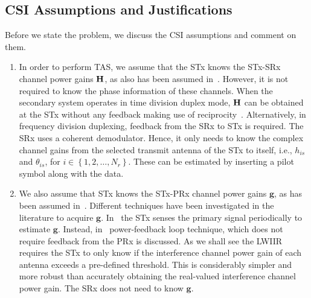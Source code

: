 \documentclass[12pt,draftcls,peerreview,onecolumn]{IEEEtran}
\newcommand{\ie}{{i.e.}}
\newcommand{\mtx}[1]{{\bf #1}} %
\newcommand{\Nr}{{N_r}}
\newcommand{\such}{h}
\newcommand{\puch}{g}
\newcommand{\hk}[1]{{\such_{#1}}}
\newcommand{\g}{\mathbf{\puch}}
\newcommand{\nropts}{\left\{1,2,\ldots,\Nr\right\}}
\newcommand{\suchph}{\theta}
\newcommand{\thetahk}{\suchph_{is}}
\newcommand{\Hmx}{\mtx{H}}
\begin{document}
\subsection{CSI Assumptions and Justifications}  
Before we state the problem, we discuss the  CSI assumptions and comment on them. 
\begin{enumerate}
\item In order to perform TAS, we assume that the STx knows the STx-SRx channel power gains $\Hmx$, as also has been assumed in~\cite{XKang_2011_JSAC,Hanif_2015_globecom,Sarvendranath_2013_TCOM,Kong_2011_JCN,Wang_2010_TWC,RZhang_2009_TWC}. However, it is not required to know the phase information of these channels. When the secondary system operates in time division duplex mode, $\Hmx$ can be obtained at the STx without any feedback making use of reciprocity~\cite{Sarvendranath_2013_TCOM}. Alternatively, in frequency division duplexing, feedback from the SRx to STx is required. The SRx uses a coherent demodulator. Hence, it only needs to know the complex channel gains from the selected transmit antenna of the STx to itself, \ie, $\hk{is}$ and $\thetahk$, for $i\in\nropts$. These can be estimated by inserting a pilot symbol along with the data. 

\item We also assume that STx knows the STx-PRx channel power gains $\g$, as has been assumed in~\cite{Hanif_2015_globecom,Sarvendranath_2013_TCOM,Kong_2011_JCN,Wang_2010_TWC,RZhang_2009_TWC}. Different techniques have been investigated in the literature to acquire $\g$. In~\cite{Zhao_2008_TSP} the STx senses the primary signal periodically to estimate $\g$. Instead, in~\cite{RZhang_2008_DSAN} power-feedback loop technique, which does not require feedback from the PRx is discussed. As we shall see the LWIIR  requires the STx to only know if the interference channel power gain of each antenna exceeds a pre-defined threshold. This is considerably simpler and more robust than accurately obtaining the real-valued interference channel power gain. The SRx does not need to know $\g$. 
\end{enumerate}
\end{document}
